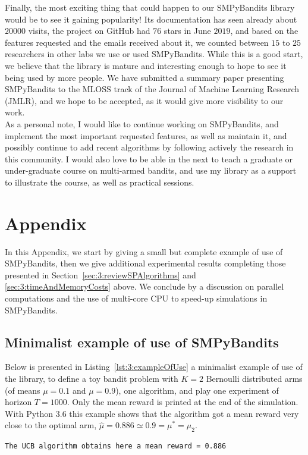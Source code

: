 Finally, the most exciting thing that could happen to our SMPyBandits library would be to see it gaining popularity!
Its documentation has seen already about $20000$ visits, the project on GitHub had $76$ stars in June $2019$, and based on the features requested and the emails received about it, we counted between $15$ to $25$ researchers in other labs we use or used SMPyBandits.
While this is a good start, we believe that the library is mature and interesting enough to hope to see it being used by more people.
%
We have submitted a summary paper presenting SMPyBandits \cite{SMPyBanditsJMLR} to the MLOSS track of the Journal of Machine Learning Research (JMLR), and we hope to be accepted, as it would give more visibility to our work.\\
%
\indent
As a personal note, I would like to continue working on SMPyBandits, and implement the most important requested features, as well as maintain it, and possibly continue to add recent algorithms by following actively the research in this community.
I would also love to be able in the next to teach a graduate or under-graduate course on multi-armed bandits, and use my library as a support to illustrate the course, as well as practical sessions.


\newpage  %
\section{Appendix}
\label{sec:3:appendix}

In this Appendix, we start by giving a small but complete example of use of SMPyBandits, then we give additional experimental results completing those presented in Section~\ref{sec:3:reviewSPAlgorithms} and \ref{sec:3:timeAndMemoryCosts} above.
We conclude by a discussion on parallel computations and the use of multi-core CPU to speed-up simulations in SMPyBandits.


\subsection{Minimalist example of use of SMPyBandits}

Below is presented in Listing~\ref{lst:3:exampleOfUse} a minimalist example of use of the library, to define a toy bandit problem with $K=2$ Bernoulli distributed arms (of means $\mu=0.1$ and $\mu=0.9$), one \UCB{} algorithm, and play one experiment of horizon $T=1000$.
Only the mean reward is printed at the end of the simulation.
%
With Python 3.6 this example shows that the algorithm got a mean reward very close to the optimal arm, $\hat{\mu} = 0.886 \simeq 0.9 = \mu^* = \mu_2$.
\begin{verbatim}
The UCB algorithm obtains here a mean reward = 0.886
\end{verbatim}


